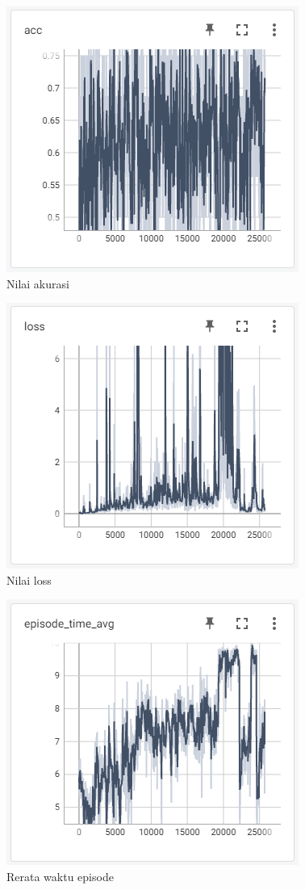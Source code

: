 \documentclass[conference]{IEEEtran}
\begin{document}
	\begin{figure}[H] 
		\centering
		\includegraphics[width=.7\linewidth]{images/acc}
		\caption{Nilai akurasi}
		\label{fig:acc}
	\end{figure}
	\begin{figure}[H] 
		\centering
		\includegraphics[width=.7\linewidth]{images/loss}
		\caption{Nilai loss}
		\label{fig:loss}
	\end{figure}
	\begin{figure}[H] 
		\centering
		\includegraphics[width=.7\linewidth]{images/episode_time_avg}
		\caption{Rerata waktu episode}
		\label{fig:episode_time_avg}
	\end{figure}
\end{document}
